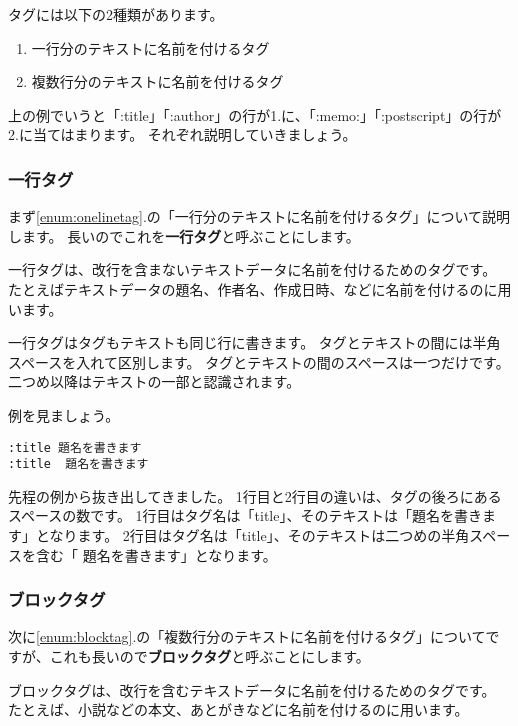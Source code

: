 \documentclass[a4j]{jsarticle}
\begin{document}
タグには以下の2種類があります。

\begin{enumerate}
  \item 一行分のテキストに名前を付けるタグ \label{enum:onelinetag}
  \item 複数行分のテキストに名前を付けるタグ \label{enum:blocktag}
\end{enumerate}

上の例でいうと「:title」「:author」の行が1.に、「:memo:」「:postscript」の行が2.に当てはまります。
それぞれ説明していきましょう。


\subsubsection{一行タグ}

まず\ref{enum:onelinetag}.の「一行分のテキストに名前を付けるタグ」について説明します。
長いのでこれを\textbf{一行タグ}と呼ぶことにします。

一行タグは、改行を含まないテキストデータに名前を付けるためのタグです。
たとえばテキストデータの題名、作者名、作成日時、などに名前を付けるのに用います。

一行タグはタグもテキストも同じ行に書きます。
タグとテキストの間には半角スペースを入れて区別します。
タグとテキストの間のスペースは一つだけです。
二つめ以降はテキストの一部と認識されます。

例を見ましょう。

\begin{lstlisting}[caption=一行タグ]
:title 題名を書きます
:title  題名を書きます
\end{lstlisting}

先程の例から抜き出してきました。
1行目と2行目の違いは、タグの後ろにあるスペースの数です。
1行目はタグ名は「title」、そのテキストは「題名を書きます」となります。
2行目はタグ名は「title」、そのテキストは二つめの半角スペースを含む「 題名を書きます」となります。


\subsubsection{ブロックタグ}

次に\ref{enum:blocktag}.の「複数行分のテキストに名前を付けるタグ」についてですが、これも長いので\textbf{ブロックタグ}と呼ぶことにします。

ブロックタグは、改行を含むテキストデータに名前を付けるためのタグです。
たとえば、小説などの本文、あとがきなどに名前を付けるのに用います。
\end{document}
